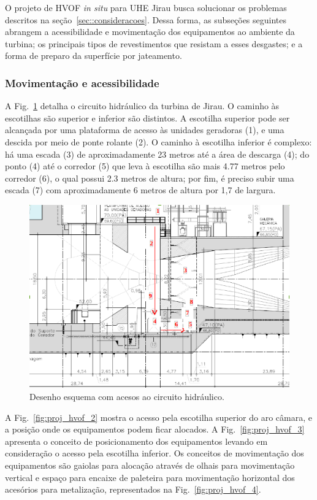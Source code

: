 O projeto de HVOF \textit{in situ} para UHE Jirau busca solucionar os problemas
descritos na seção~\ref{sec::consideracoes}. Dessa forma, as subseções seguintes
abrangem a acessibilidade e movimentação dos equipamentos ao ambiente da
turbina; os principais tipos de revestimentos que resistam a esses desgastes; e
a forma de preparo da superfície por jateamento.

\subsubsection{Movimentação e acessibilidade}
A Fig.~\ref{fig:proj_hvof_1} detalha o circuito hidráulico da turbina de
Jirau. O caminho às escotilhas são superior e inferior são distintos. A
escotilha superior pode ser alcançada por uma plataforma de acesso às unidades
geradoras (1), e uma descida por meio de ponte rolante (2). O caminho à
escotilha inferior é complexo: há uma escada (3) de
aproximadamente 23 metros até a área de descarga (4); do ponto (4) até o
corredor (5) que leva à escotilha são mais 4.77 metros pelo corredor (6), o qual
possui 2.3 metros de altura; por fim, é preciso subir uma escada (7) com
aproximadamente 6 metros de altura por 1,7 de largura.

\begin{figure}
	\centering
	\includegraphics[width=1\columnwidth]{sota/figs/projeto/proj_hvof_1.png}
    \caption{Desenho esquema com acesos ao circuito hidráulico.}
    \label{fig:proj_hvof_1}
\end{figure}

A Fig.~\ref{fig:proj_hvof_2} mostra o acesso pela escotilha superior
do aro câmara, e a posição onde os equipamentos podem ficar alocados. A
Fig.~\ref{fig:proj_hvof_3} apresenta o conceito de posicionamento dos
equipamentos levando em consideração o acesso pela escotilha inferior.
Os conceitos de movimentação dos equipamentos são gaiolas para alocação através
de olhais para movimentação vertical e espaço para encaixe de paleteira para
movimentação horizontal dos acesórios para metalização, representados na
Fig.~\ref{fig:proj_hvof_4}.

